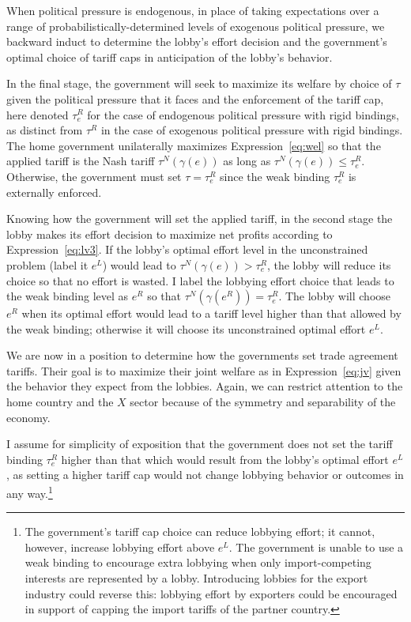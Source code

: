 \documentclass[12pt]{article}
\newcommand{\ga}{\gamma}
\begin{document}
When political pressure is endogenous, in place of taking expectations over a range of probabilistically-determined levels of exogenous political pressure, we backward induct to determine the lobby's effort decision and the government's optimal choice of tariff caps in anticipation of the lobby's behavior.

In the final stage, the government will seek to maximize its welfare by choice of $\tau$ given the political pressure that it faces and the enforcement of the tariff cap, here denoted $\tau_e^R$ for the case of endogenous political pressure with rigid bindings, as distinct from $\tau^R$ in the case of exogenous political pressure with rigid bindings. The home government unilaterally maximizes Expression~\ref{eq:wel} so that the applied tariff is the Nash tariff $\tau^N(\ga(e))$ as long as $\tau^N(\ga(e)) \leq \tau_e^R$. Otherwise, the government must set $\tau = \tau_e^R$ since the weak binding $\tau_e^R$ is externally enforced.

Knowing how the government will set the applied tariff, in the second stage the lobby makes its effort decision to maximize net profits according to Expression~\ref{eq:lv3}. If the lobby's optimal effort level in the unconstrained problem (label it $e^L$) would lead to $\tau^N(\ga(e)) > \tau_e^R$, the lobby will reduce its choice so that no effort is wasted. I label the lobbying effort choice that leads to the weak binding level as $e^R$ so that $\tau^N(\ga(e^R)) = \tau_e^R$. The lobby will choose $e^R$ when its optimal effort would lead to a tariff level higher than that allowed by the weak binding; otherwise it will choose its unconstrained optimal effort $e^L$. 

We are now in a position to determine how the governments set trade agreement tariffs. Their goal is to maximize their joint welfare as in Expression~\ref{eq:jv} given the behavior they expect from the lobbies. Again, we can restrict attention to the home country and the $X$ sector because of the symmetry and separability of the economy.

I assume for simplicity of exposition that the government does not set the tariff binding $\tau_e^R$ higher than that which would result from the lobby's optimal effort $e^L$, as setting a higher tariff cap would not change lobbying behavior or outcomes in any way.\footnote{The government's tariff cap choice can reduce lobbying effort; it cannot, however, increase lobbying effort above $e^L$. The government is unable to use a weak binding to encourage extra lobbying when only import-competing interests are represented by a lobby. Introducing lobbies for the export industry could reverse this: lobbying effort by exporters could be encouraged in support of capping the import tariffs of the partner country.}
\end{document}
